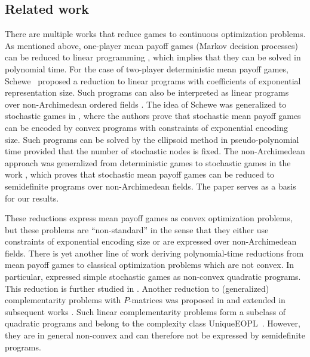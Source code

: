 \documentclass[11pt]{article}
\theoremstyle{definition}
\theoremstyle{remark}
\begin{document}
\subsection{Related work}
There are multiple works that reduce 
games to continuous optimization problems. As mentioned above, one-player mean payoff games (Markov decision processes) can be reduced to linear programming \cite{puterman}, which implies that they can be solved in polynomial time. 
For the case of two-player deterministic mean payoff games, Schewe~\cite{schewe2009parity} proposed a reduction to linear programs with coefficients of exponential representation size. 
Such programs can also be interpreted as linear programs over non-Archimedean ordered fields \cite{tropical_simplex,combinatorial_mean_payoff,AllamigeonBenchimolGaubertJoswig:2021}.
The idea of Schewe was generalized to stochastic games in \cite{BorosElbassioniGurvichMakino:2017}, where the authors prove that stochastic mean payoff games can be encoded by convex programs with constraints of exponential encoding size. 
Such programs can be solved by the ellipsoid method in pseudo-polynomial time provided that the number of stochastic nodes is fixed. 
The non-Archimedean approach was generalized from deterministic games to stochastic games in the work \cite{issac2016jsc}, which proves that stochastic mean payoff games can be reduced to semidefinite programs over non-Archimedean fields. 
The paper \cite{issac2016jsc} serves as a basis for our results. 

These reductions express mean payoff games as convex optimization problems, but these problems are ``non-standard'' in the sense that they either use constraints of exponential encoding size or are expressed over non-Archimedean fields. 
There is yet another line of work deriving polynomial-time reductions from mean payoff games to classical optimization problems which are not convex. 
In particular, \cite{Condon:1993} expressed simple stochastic games as non-convex quadratic programs. 
This reduction is further studied in \cite{Kretinsky2022comparison}. 
Another reduction to (generalized) complementarity problems with $P$-matrices was proposed in \cite{GaertnerRuest:2005,SvenssonVorobyov:2006} and extended in subsequent works \cite{JurdzinskiSavani:2008,FearnyJurdzinskiSavani:2010,HansenIbsenJensen:2013}. 
Such linear complementarity problems form a subclass of quadratic programs and belong to the complexity class UniqueEOPL~\cite{fearnley2020unique}. 
However, they are in general non-convex and can therefore not be expressed by semidefinite programs. 
\end{document}
